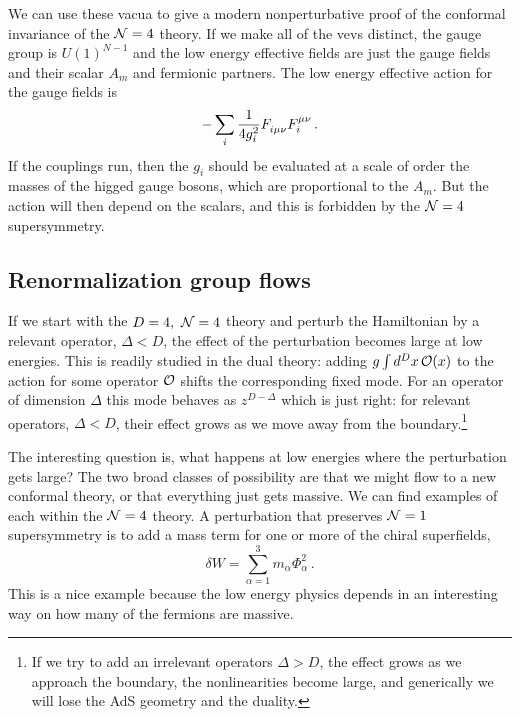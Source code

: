 \documentclass[12pt]{article}
\begin{document}
{We can use these vacua to give a modern nonperturbative proof of the conformal invariance of the ${\cal N}=4$ theory.  If we make all of the vevs distinct, the gauge group is $U(1)^{N-1}$ and the low energy effective fields are just the gauge fields and their scalar $A_m$ and fermionic partners.  The low energy effective action for the gauge fields is
\begin{equation}
-\sum_i \frac{1}{4g_i^2} F^{\vphantom \mu}_{i\mu\nu}F_i^{\mu\nu}  \,. \label{effab}
\end{equation}
If the couplings run, then the $g_i$ should be evaluated at a scale of order the masses of the higged gauge bosons, which are proportional to the $A_m$.  But the action will then depend on the scalars, and this is forbidden by the ${\cal N}=4$ supersymmetry.

\subsection{Renormalization group flows}

If we start with the $D=4,\ {\cal N}=4$ theory and perturb the Hamiltonian by a relevant operator, $\Delta < D$, the effect of the perturbation becomes large at low energies.  This is readily studied in the dual theory: adding $g \int d^Dx\, {\cal O}(x)$ to the action for some operator $\cal O$ shifts the corresponding fixed mode.  For an operator of dimension $\Delta$ this mode behaves as $z^{D-\Delta}$ which is just right: for relevant operators, $\Delta < D$, their effect grows as we move away from the boundary.\footnote{If we try to add an irrelevant operators $\Delta > D$, the effect grows as we approach the boundary, the nonlinearities become large, and generically we will lose the AdS geometry and the duality.}  

The interesting question is, what happens at low energies where the perturbation gets large?  The two broad classes of possibility are that we might flow to a new conformal theory, or that everything just gets massive.  We can find examples of each within the ${\cal N}=4$ theory.  A perturbation that preserves ${\cal N}=1$ supersymmetry is to add a mass term for one or more of the chiral superfields,
\begin{equation}
\delta W = \sum_{\alpha = 1}^3 m_\alpha \Phi^2_\alpha \,.
\end{equation}
This is a nice example because the low energy physics depends in an interesting way on how many of the fermions are massive.

}
\end{document}
